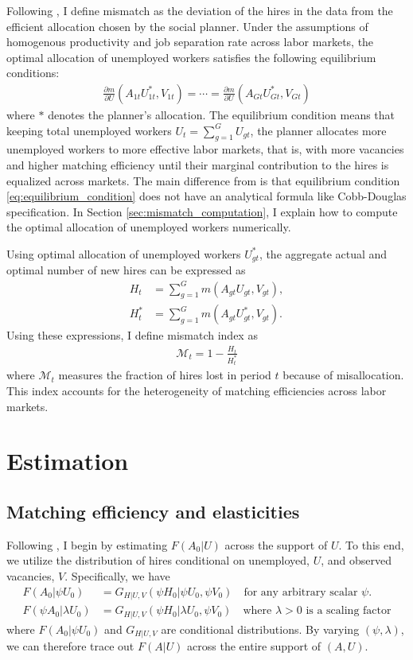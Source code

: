 \documentclass[12pt]{article}
\begin{document}
Following \cite{csahin2014mismatch}, I define mismatch as the deviation of the hires in the data from the efficient allocation chosen by the social planner.
Under the assumptions of homogenous productivity and job separation rate across labor markets, the optimal allocation of unemployed workers satisfies the following equilibrium conditions:
\begin{align}
    \frac{\partial m}{\partial U}\left(A_{1t}U_{1t}^{*},V_{1t}\right)=\cdots=\frac{\partial m}{\partial U}\left(A_{Gt}U_{Gt}^{*},V_{Gt}\right) \label{eq:equilibrium_condition}
\end{align}
where $*$ denotes the planner's allocation.
The equilibrium condition means that keeping total unemployed workers $U_{t}=\sum_{g=1}^{G}U_{gt}$, the planner allocates more unemployed workers to more effective labor markets, that is, with more vacancies and higher matching efficiency until their marginal contribution to the hires is equalized across markets.
The main difference from \cite{csahin2014mismatch} is that equilibrium condition \eqref{eq:equilibrium_condition} does not have an analytical formula like Cobb-Douglas specification.
In Section \ref{sec:mismatch_computation}, I explain how to compute the optimal allocation of unemployed workers numerically.

Using optimal allocation of unemployed workers $U_{gt}^{*}$, the aggregate actual and optimal number of new hires can be expressed as
\begin{align*}
    H_{t}&=\sum_{g=1}^{G}m(A_{gt}U_{gt},V_{gt}),\\
    H_{t}^{*}&=\sum_{g=1}^{G}m(A_{gt}U_{gt}^{*},V_{gt}).
\end{align*}
Using these expressions, I define mismatch index as 
\begin{align}
    \mathcal{M}_{t}=1-\frac{H_{t}}{H_{t}^{*}}
\end{align}
where $\mathcal{M}_{t}$ measures the fraction of hires lost in period $t$ because of misallocation.
This index accounts for the heterogeneity of
matching efficiencies across labor markets.

\section{Estimation}
\subsection{Matching efficiency and elasticities}
Following \cite{lange2020beyond}, I begin by estimating $F(A_0|U)$ across the support of $U$. To this end, we utilize the distribution of hires conditional on unemployed, $U$, and observed vacancies, $V$. 
Specifically, we have
\begin{align*}
    F(A_0|\psi U_0) &= G_{H|U,V}(\psi H_0|\psi U_0, \psi V_0) \quad \text{for any arbitrary scalar } \psi.\\
    F(\psi A_0|\lambda U_0) &= G_{H|U,V}(\psi H_0|\lambda U_0, \psi V_0) \quad \text{where } \lambda > 0 \text{ is a scaling factor}
\end{align*}
where $F(A_0|\psi U_0)$ and $ G_{H|U,V}$ are conditional distributions.
By varying $(\psi, \lambda)$, we can therefore trace out $F(A|U)$ across the entire support of $(A, U)$.
\end{document}
